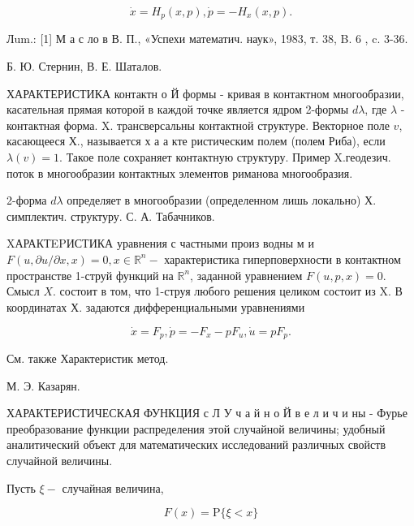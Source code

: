 \documentclass[10pt]{article}
\begin{document}
\[

\dot{x}=H_{p}(x, p), \dot{p}=-H_{x}(x, p) .

\]



Лum.: [1] М а с ло в В. П., «Успехи математич. наук», 1983, т. 38, B. 6 , c. 3-36.



Б. Ю. Стернин, В. Е. Шаталов.



ХАРАКТЕРИСТИКА контактн о Й формы - кривая в контактном многообразии, касательная прямая которой в каждой точке является ядром 2-формы $d \lambda$, где $\lambda$ - контактная форма. X. трансверсальны контактной структуре. Векторное поле $v$, касающееся Х., называется х а а кте ристическим полем (полем Риба), если $\lambda(v)=1$. Такое поле сохраняет контактную структуру. Пример X.геодезич. поток в многообразии контактных элементов риманова многообразия.



2-форма $d \lambda$ определяет в многообразии (определенном лишь локально) Х. симплектич. структуру. С. А. Табачников.



XАРАКТEPИСТИКА уравнения с частными произ водны м и $F(u, \partial u / \partial x, x)=0, x \in \mathbb{R}^{n}-$ характеристика гиперповерхности в контактном пространстве 1-струй функций на $\mathbb{R}^{n}$, заданной уравнением $F(u, p, x)=0$. Смысл $X$. состоит в том, что 1-струя любого решения целиком состоит из X. В координатах Х. задаются дифференциальными уравнениями



\[

\dot{x}=F_{p}, \dot{p}=-F_{x}-p F_{u}, \dot{u}=p F_{p} .

\]



См. также Характеристик метод.



М. Э. Казарян.



ХАРАКТЕРИСТИЧЕСКАЯ ФУНКЦИЯ с Л У ч а й н о Й в е л и ч и ны - Фурье преобразование функции распределения этой случайной величины; удобный аналитический объект для математических исследований различных свойств случайной величины.



Пусть $\xi-$ случайная величина,



\[

F(x)=\mathrm{P}\{\xi<x\}

\]
\end{document}
